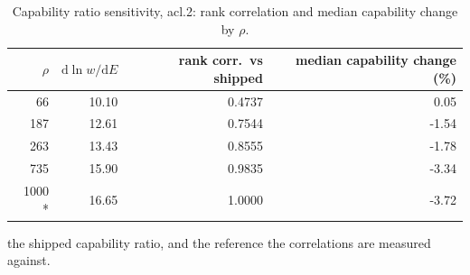 \begin{table}[htbp]
  \centering
  \caption{Capability ratio sensitivity, acl.2: rank correlation and median capability change by $\rho$.}
  \label{tab:rho-acl-2-summary}
  \begin{tabular}{r r r r}
    \toprule
    $\rho$ & $\mathrm{d}\ln w/\mathrm{d}E$ & rank corr.\ vs shipped & median capability change (\%) \\
    \midrule
    66 & 10.10 & 0.4737 & 0.05 \\
    187 & 12.61 & 0.7544 & -1.54 \\
    263 & 13.43 & 0.8555 & -1.78 \\
    735 & 15.90 & 0.9835 & -3.34 \\
    1000 * & 16.65 & 1.0000 & -3.72 \\
    \bottomrule
  \end{tabular}
  \par\smallskip\footnotesize * the shipped capability ratio, and the reference the correlations are measured against.
\end{table}
